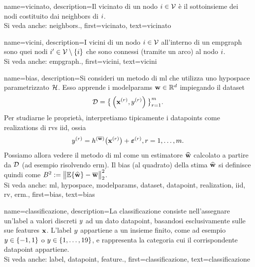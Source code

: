 {name={vicinato},
	description={Il vicinato di un nodo $i \in \mathcal{V}$ è 
		il sottoinsieme dei nodi costituito dai \gls{neighbors} di $i$.
				\\ 
		Si veda anche: \gls{neighbors}.},
	first={vicinato},
	text={vicinato} 
}

{name={vicini},
	description={I vicini di un nodo $i \in \mathcal{V}$ 
		all'interno di un \gls{empgraph} sono quei nodi $i' \in \mathcal{V} \setminus \{ i\}$ 
		che sono connessi (tramite un arco) al nodo $i$.
				\\ 
		Si veda anche: \gls{empgraph}.},
	first={vicini},
	text={vicini} 
}

{name={bias},
	description={Si consideri un metodo di \gls{ml} che utilizza uno \gls{hypospace} parametrizzato $\mathcal{H}$. 
		Esso apprende i \gls{modelparams} ${\bf w} \in \mathbb{R}^{d}$ impiegando il \gls{dataset} $$\mathcal{D}=\big\{ \left( {\bf x}^{(r)},y^{(r)} \right) \big\}_{r=1}^{m}.$$ 
		Per studiarne le proprietà, interpretiamo tipicamente i \glspl{datapoint} come \glspl{realization} 
		di \glspl{rv} \gls{iid}, ossia $$y^{(r)} = h^{(\overline{{\bf w}})}\big( {\bf x}^{(r)} \big) + \bm{\varepsilon}^{(r)}, r=1, \ldots, m.$$ 
		Possiamo allora vedere il metodo di \gls{ml} come un estimatore $\widehat{{\bf w}}$ 
		calcolato a partire da $\mathcal{D}$ (ad esempio risolvendo \gls{erm}). Il bias (al quadrato) della stima $\widehat{{\bf w}}$ 
		si definisce quindi come $B^{2} := \big\| \mathbb{E} \{ \widehat{{\bf w}}  \}- \overline{{\bf w}}\big\|_{2}^{2}$.
					\\ 
		Si veda anche: \gls{ml}, \gls{hypospace}, \gls{modelparams}, \gls{dataset}, \gls{datapoint}, \gls{realization}, \gls{iid}, \gls{rv}, \gls{erm}.},
	first={bias},
	text={bias} 
}

{name={classificazione},
	description={La classificazione consiste nell’assegnare un'\gls{label} 
	a valori discreti $y$ ad un dato \gls{datapoint}, basandosi esclusivamente sulle sue 
 		\glspl{feature} ${\bf x}$. L'\gls{label} $y$ appartiene a un insieme finito,
		come ad esempio $y \in \{-1,1\}$ o $y \in \{1, \ldots, 19\}$, e rappresenta la categoria 
		cui il corrispondente \gls{datapoint} appartiene.
						\\ 
		Si veda anche: \gls{label}, \gls{datapoint}, \gls{feature}.},
	first={classificazione},
	text={classificazione} 
}


